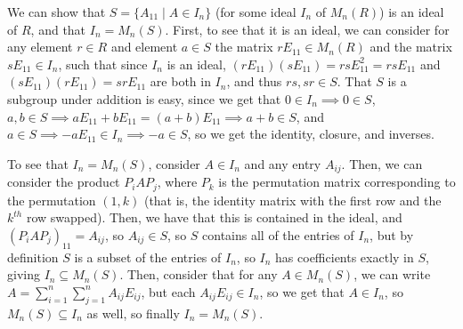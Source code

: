 \documentclass[12pt,letterpaper]{article}
\theoremstyle{definition}
\begin{document}
We can show that $S = \{A_{11} \mid A \in I_{n}\}$ (for some ideal $I_{n}$ of $M_{n}(R)$) is an ideal of $R$, and that $I_{n} = M_{n}(S)$. First, to see that it is an ideal, we can consider for any element $r \in R$ and element $a \in S$ the matrix $rE_{11} \in M_{n}(R)$ and the matrix $sE_{11} \in I_{n}$, such that since $I_{n}$ is an ideal, $(rE_{11})(sE_{11}) = rsE_{11}^{2} = rsE_{11}$ and $(sE_{11})(rE_{11}) = srE_{11}$ are both in $I_{n}$, and thus $rs, sr \in S$. That $S$ is a subgroup under addition is easy, since we get that $0 \in I_{n} \implies 0 \in S$, $a, b \in S \implies aE_{11} + bE_{11} = (a + b)E_{11} \implies a + b \in S$, and $a \in S \implies -aE_{11} \in I_{n} \implies -a \in S$, so we get the identity, closure, and inverses.

To see that $I_{n} = M_{n}(S)$, consider $A \in I_{n}$ and any entry $A_{ij}$. Then, we can consider the product $P_{i}AP_{j}$, where $P_{k}$ is the permutation matrix corresponding to the permutation $(1,k)$ (that is, the identity matrix with the first row and the $k^{th}$ row swapped). Then, we have that this is contained in the ideal, and $(P_{i}AP_{j})_{11} = A_{ij}$, so $A_{ij} \in S$, so $S$ contains all of the entries of $I_{n}$, but by definition $S$ is a subset of the entries of $I_{n}$, so $I_{n}$ has coefficients exactly in $S$, giving $I_{n} \subseteq M_{n}(S)$. Then, consider that for any $A \in M_{n}(S)$, we can write $A = \sum_{i=1}^{n}\sum_{j=1}^{n}A_{ij}E_{ij}$, but each $A_{ij}E_{ij} \in I_{n}$, so we get that $A \in I_{n}$, so $M_{n}(S) \subseteq I_{n}$ as well, so finally $I_{n} = M_{n}(S)$.
\end{document}

